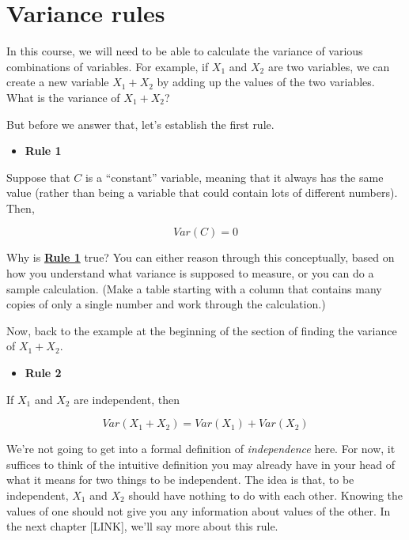 \documentclass[
]{book}
\providecommand{\tightlist}{%
  \setlength{\itemsep}{0pt}\setlength{\parskip}{0pt}}
\begin{document}
\hypertarget{variance-rules}{%
\section{Variance rules}\label{variance-rules}}

In this course, we will need to be able to calculate the variance of various combinations of variables. For example, if \(X_{1}\) and \(X_{2}\) are two variables, we can create a new variable \(X_{1} + X_{2}\) by adding up the values of the two variables. What is the variance of \(X_{1} + X_{2}\)?

But before we answer that, let's establish the first rule.

\begin{itemize}
\tightlist
\item
  \textbf{Rule 1}
\end{itemize}

Suppose that \(C\) is a ``constant'' variable, meaning that it always has the same value (rather than being a variable that could contain lots of different numbers). Then,

\[
Var\left(C\right) = 0
\]

Why is \protect\hyperlink{Rule1}{\textbf{Rule 1}} true? You can either reason through this conceptually, based on how you understand what variance is supposed to measure, or you can do a sample calculation. (Make a table starting with a column that contains many copies of only a single number and work through the calculation.)

Now, back to the example at the beginning of the section of finding the variance of \(X_{1} + X_{2}\).

\begin{itemize}
\tightlist
\item
  \textbf{Rule 2}
\end{itemize}

If \(X_{1}\) and \(X_{2}\) are independent, then

\[
Var\left(X_{1} + X_{2}\right) =
Var\left(X_{1}\right) + Var\left(X_{2}\right)
\]

We're not going to get into a formal definition of \emph{independence} here. For now, it suffices to think of the intuitive definition you may already have in your head of what it means for two things to be independent. The idea is that, to be independent, \(X_{1}\) and \(X_{2}\) should have nothing to do with each other. Knowing the values of one should not give you any information about values of the other. In the next chapter {[}LINK{]}, we'll say more about this rule.
\end{document}
